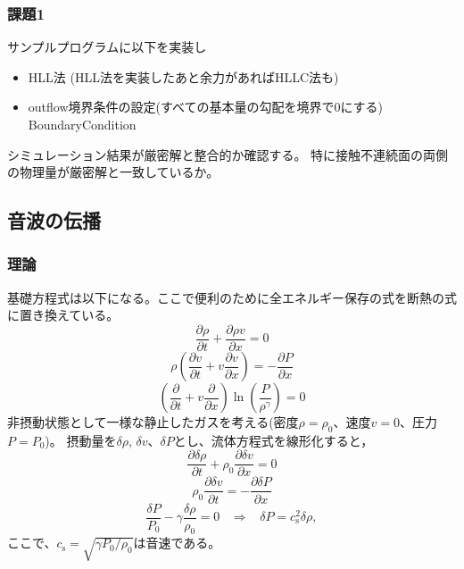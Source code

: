 {\begin{itemize}
\end{itemize}


\subsubsection{課題1}

サンプルプログラムに以下を実装し
\begin{itemize}
    \item HLL法 (HLL法を実装したあと余力があればHLLC法も)
    \item outflow境界条件の設定(すべての基本量の勾配を境界で0にする)
    {\ttfamily BoundaryCondition}
\end{itemize}
シミュレーション結果が厳密解と整合的か確認する。
特に接触不連続面の両側の物理量が厳密解と一致しているか。



\newpage
\subsection{音波の伝播}

\subsubsection{理論}

基礎方程式は以下になる。ここで便利のために全エネルギー保存の式を断熱の式に置き換えている。
\begin{equation}
    \frac{\partial \rho}{\partial t} + \frac{\partial \rho v}{\partial x} = 0
\end{equation}
\begin{equation}
    \rho\left(\frac{\partial v}{\partial t} + v\frac{\partial v}{\partial x}\right) =
    - \frac{\partial P}{\partial x} 
\end{equation}
\begin{equation}
   \left(\frac{\partial }{\partial t} + v\frac{\partial }{\partial x}\right)
   \ln \left(\frac{P}{\rho^\gamma}\right) = 0
\end{equation}
非摂動状態として一様な静止したガスを考える(密度$\rho=\rho_0$、速度$v=0$、圧力$P=P_0$)。
摂動量を$\delta \rho$, $\delta v$、$\delta P$とし、流体方程式を線形化すると，
\begin{equation}
    \frac{\partial \delta \rho}{\partial t} + \rho_0 \frac{\partial \delta v}{\partial x} = 0
    \label{eoc_sound}
\end{equation}
\begin{equation}
    \rho_0\frac{\partial \delta v}{\partial t} = 
    - \frac{\partial \delta P}{\partial x} 
    \label{eom_sound}
\end{equation}
\begin{equation}
\frac{\delta P}{P_0} -\gamma \frac{\delta \rho}{\rho_0}  = 0 \;\;\;
\Rightarrow \;\;\; \delta P = c_\mathrm{s}^2 \delta \rho,
    \label{eoe_sound}
\end{equation}
ここで、$c_\mathrm{s}=\sqrt{\gamma P_0/\rho_0}$は音速である。

}
